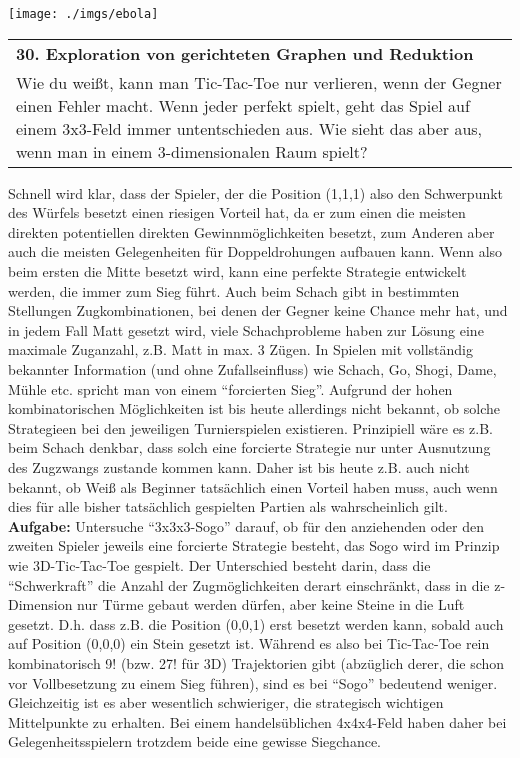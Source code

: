 \documentclass[paper=A4, pagesize, DIV=calc, smallheadings,
fontsize=11pt, expansion=false]{scrreprt}
\begin{document}
\begin{minipage}[H]{0.3\linewidth}
\texttt{[image: ./imgs/ebola]}
\end{minipage}
\begin{tabular}{m{30em}}
  \textbf{30. Exploration von gerichteten Graphen und Reduktion}\\ 
  Wie du weißt, kann man Tic-Tac-Toe nur verlieren, wenn der Gegner einen Fehler macht. 
  Wenn jeder perfekt spielt, geht das Spiel auf einem 3x3-Feld immer untentschieden aus. Wie sieht das aber aus, wenn man in einem 3-dimensionalen Raum spielt? \end{tabular}
  Schnell wird klar, dass der Spieler, der die Position (1,1,1) also den Schwerpunkt des Würfels besetzt einen riesigen Vorteil hat, da er zum einen die meisten direkten potentiellen direkten Gewinnmöglichkeiten besetzt, zum Anderen aber auch die meisten Gelegenheiten für Doppeldrohungen aufbauen kann. Wenn also beim ersten die Mitte besetzt wird, kann eine perfekte Strategie entwickelt werden, die immer zum Sieg führt. Auch beim Schach gibt in bestimmten Stellungen Zugkombinationen, bei denen der Gegner keine Chance mehr hat, und in jedem Fall Matt gesetzt wird, viele Schachprobleme haben zur Lösung eine maximale Zuganzahl, z.B. Matt in max. 3 Zügen. 
  In Spielen mit vollständig bekannter Information (und ohne Zufallseinfluss) wie Schach, Go, Shogi, Dame, Mühle etc. spricht man von einem ``forcierten Sieg''. Aufgrund der hohen kombinatorischen Möglichkeiten ist bis heute allerdings nicht bekannt, ob solche Strategieen bei den jeweiligen Turnierspielen existieren. 
Prinzipiell wäre es z.B. beim Schach denkbar, dass solch eine forcierte Strategie nur unter Ausnutzung des Zugzwangs zustande kommen kann. Daher ist bis heute z.B. auch nicht bekannt, ob Weiß als Beginner tatsächlich einen Vorteil haben muss, auch wenn dies für alle bisher tatsächlich gespielten Partien als wahrscheinlich gilt.
  \textbf{Aufgabe:} 
  Untersuche ``3x3x3-Sogo'' darauf, ob für den anziehenden oder den zweiten Spieler jeweils eine forcierte Strategie besteht, das 
  Sogo wird im Prinzip wie 3D-Tic-Tac-Toe gespielt. Der Unterschied besteht darin, dass die ``Schwerkraft'' die Anzahl der Zugmöglichkeiten derart einschränkt, dass in die z-Dimension nur Türme gebaut werden dürfen, aber keine Steine in die Luft gesetzt. D.h. dass z.B. die Position (0,0,1) erst besetzt werden kann, sobald auch auf Position (0,0,0) ein Stein gesetzt ist.
Während es also bei Tic-Tac-Toe rein kombinatorisch 9! (bzw. 27! für 3D) Trajektorien gibt (abzüglich derer, die schon vor Vollbesetzung zu einem Sieg führen), sind es bei ``Sogo'' bedeutend weniger. Gleichzeitig ist es aber wesentlich schwieriger, die strategisch wichtigen Mittelpunkte zu erhalten. Bei einem handelsüblichen 4x4x4-Feld haben daher bei Gelegenheitsspielern trotzdem beide eine gewisse Siegchance.
\end{document}
